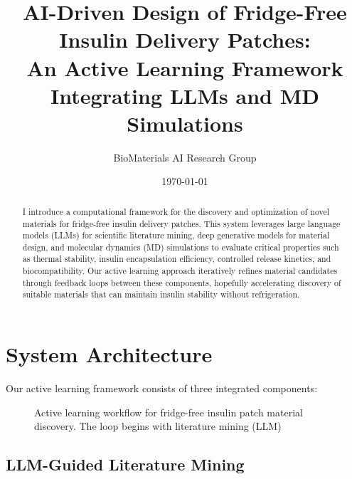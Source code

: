 \documentclass[11pt,a4paper]{article}
\title{\Large\textbf{AI-Driven Design of Fridge-Free Insulin Delivery Patches:\\An Active Learning Framework Integrating LLMs and MD Simulations}}
\author{BioMaterials AI Research Group}
\date{\today}
\begin{document}
\maketitle

\begin{abstract}
I introduce a computational framework for the discovery and optimization of novel materials for fridge-free insulin delivery patches. This system leverages large language models (LLMs) for scientific literature mining, deep generative models for material design, and molecular dynamics (MD) simulations to evaluate critical properties such as thermal stability, insulin encapsulation efficiency, controlled release kinetics, and biocompatibility. Our active learning approach iteratively refines material candidates through feedback loops between these components, hopefully accelerating discovery of suitable materials that can maintain insulin stability without refrigeration.
\end{abstract}

\section{System Architecture}

Our active learning framework consists of three integrated components:

\begin{figure}[h]
\centering
{}
\caption{Active learning workflow for fridge-free insulin patch material discovery. The loop begins with literature mining (LLM)}
\label{fig:workflow}
\end{figure}

\subsection{LLM-Guided Literature Mining}
\end{document}
